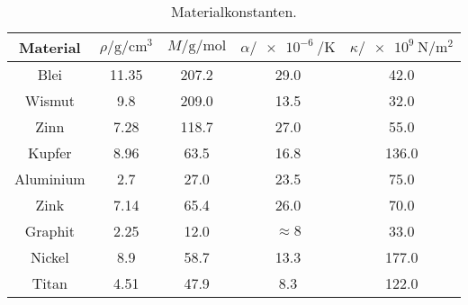 \begin{table}
    \centering
    \caption{Materialkonstanten\cite{v201}.}
    \label{tab:const}
    \begin{tabular}{c S[table-format=2.1(0)e0] S[table-format=3.2(0)e0] S S[table-format=3.2(0)e0] }
        \toprule
        {Material} & {$ρ/\si{\gram\per\cm\cubed}$} & {$M/\si{\gram\per\mol}$} & {$α/\SI{e-6}{\per\kelvin}$} & {$κ/\SI{e9}{\newton\per\meter\squared}$} \\
        \midrule
        {Blei} & 11.35 & 207.2 & 29.0  & 42.0  \\
        {Wismut} & 9.8   & 209.0 & 13.5  & 32.0  \\
        {Zinn} & 7.28  & 118.7 & 27.0  & 55.0  \\
        {Kupfer} & 8.96  & 63.5  & 16.8  & 136.0     \\
        {Aluminium} & 2.7   & 27.0  & 23.5  & 75.0  \\
        {Zink} & 7.14  & 65.4  & 26.0  & 70.0  \\
        {Graphit} & 2.25  & 12.0  & {$\approx 8$}   & 33.0  \\
        {Nickel} & 8.9   & 58.7  & 13.3  & 177.0     \\
        {Titan} & 4.51  & 47.9  & 8.3   & 122.0     \\
        \bottomrule
    \end{tabular}
\end{table}
